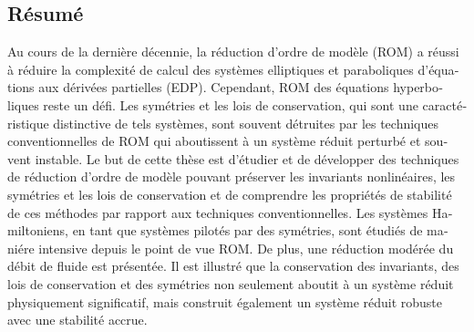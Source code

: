\begin{otherlanguage}{french}
\cleardoublepage
\chapter*{Résumé}
Au cours de la derni\`ere d\'ecennie, la r\'eduction d'ordre de mod\`ele (ROM) a r\'eussi \`a r\'eduire la complexit\'e de calcul des syst\`emes elliptiques et paraboliques d'\'equations aux d\'eriv\'ees partielles (EDP). Cependant, ROM des \'equations hyperboliques reste un d\'efi. Les sym\'etries et les lois de conservation, qui sont une caract\'eristique distinctive de tels syst\`emes, sont souvent d\'etruites par les techniques conventionnelles de ROM qui aboutissent \`a un syst\`eme r\'eduit perturb\'e et souvent instable. Le but de cette th\`ese est d'\'etudier et de d\'evelopper des techniques de r\'eduction d'ordre de mod\`ele pouvant pr\'eserver les invariants nonlin\'eaires, les sym\'etries et les lois de conservation et de comprendre les propri\'et\'es de stabilit\'e de ces m\'ethodes par rapport aux techniques conventionnelles. Les syst\`emes Hamiltoniens, en tant que syst\`emes pilot\'es par des sym\'etries, sont \'etudi\'es de mani\'ere intensive depuis le point de vue ROM. De plus, une r\'eduction mod\'er\'ee du d\'ebit de fluide est pr\'esent\'ee. Il est illustr\'e que la conservation des invariants, des lois de conservation et des sym\'etries non seulement aboutit \`a un syst\`eme r\'eduit physiquement significatif, mais construit \'egalement un syst\`eme r\'eduit robuste avec une stabilit\'e accrue.
\end{otherlanguage}


